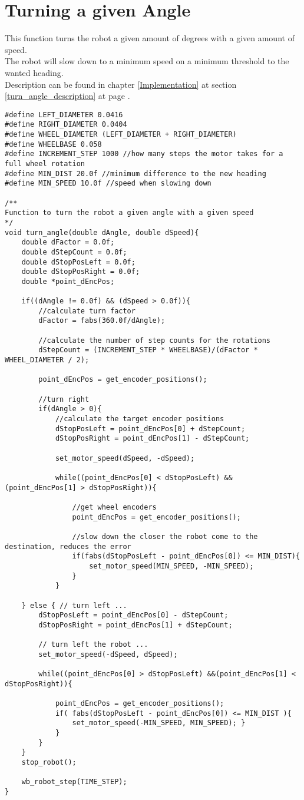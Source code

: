 \section{Turning a given Angle}
\label{turning_angle_code}
This function turns the robot a given amount of degrees with a given amount of speed.\\
The robot will slow down to a minimum speed on a minimum threshold to the wanted heading.\\
Description can be found in chapter \ref{Implementation} at section \ref{turn_angle_description} at page \pageref{turn_angle_description}. 

\begin{lstlisting}[caption = {Turning an angle}]
#define LEFT_DIAMETER 0.0416
#define RIGHT_DIAMETER 0.0404
#define WHEEL_DIAMETER (LEFT_DIAMETER + RIGHT_DIAMETER)
#define WHEELBASE 0.058 
#define INCREMENT_STEP 1000 //how many steps the motor takes for a full wheel rotation
#define MIN_DIST 20.0f //minimum difference to the new heading
#define MIN_SPEED 10.0f //speed when slowing down

/**
Function to turn the robot a given angle with a given speed
*/
void turn_angle(double dAngle, double dSpeed){
	double dFactor = 0.0f;
	double dStepCount = 0.0f;
	double dStopPosLeft = 0.0f;
	double dStopPosRight = 0.0f;
	double *point_dEncPos;
	
	if((dAngle != 0.0f) && (dSpeed > 0.0f)){
		//calculate turn factor
		dFactor = fabs(360.0f/dAngle);
		
		//calculate the number of step counts for the rotations
		dStepCount = (INCREMENT_STEP * WHEELBASE)/(dFactor * WHEEL_DIAMETER / 2);
		
		point_dEncPos = get_encoder_positions();
		
		//turn right
		if(dAngle > 0){
			//calculate the target encoder positions
			dStopPosLeft = point_dEncPos[0] + dStepCount;
			dStopPosRight = point_dEncPos[1] - dStepCount;
			
			set_motor_speed(dSpeed, -dSpeed);
			
			while((point_dEncPos[0] < dStopPosLeft) && (point_dEncPos[1] > dStopPosRight)){
				
				//get wheel encoders
				point_dEncPos = get_encoder_positions();
				
				//slow down the closer the robot come to the destination, reduces the error
				if(fabs(dStopPosLeft - point_dEncPos[0]) <= MIN_DIST){
					set_motor_speed(MIN_SPEED, -MIN_SPEED);
				}
			}	
		
	} else { // turn left ...
		dStopPosLeft = point_dEncPos[0] - dStepCount;
		dStopPosRight = point_dEncPos[1] + dStepCount;

		// turn left the robot ...
		set_motor_speed(-dSpeed, dSpeed);

		while((point_dEncPos[0] > dStopPosLeft) &&(point_dEncPos[1] < dStopPosRight)){

			point_dEncPos = get_encoder_positions();
			if( fabs(dStopPosLeft - point_dEncPos[0]) <= MIN_DIST ){
				set_motor_speed(-MIN_SPEED, MIN_SPEED); }
			}
		}
	}
	stop_robot();

	wb_robot_step(TIME_STEP);
}

\end{lstlisting}

